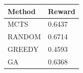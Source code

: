 \begin{tabular}{ll}
\hline
Method & Reward \\
\hline
  MCTS & 0.6437 \\
  RANDOM & 0.6714 \\
  GREEDY & 0.4593 \\
  GA & 0.6368 \\
\hline
\end{tabular}
